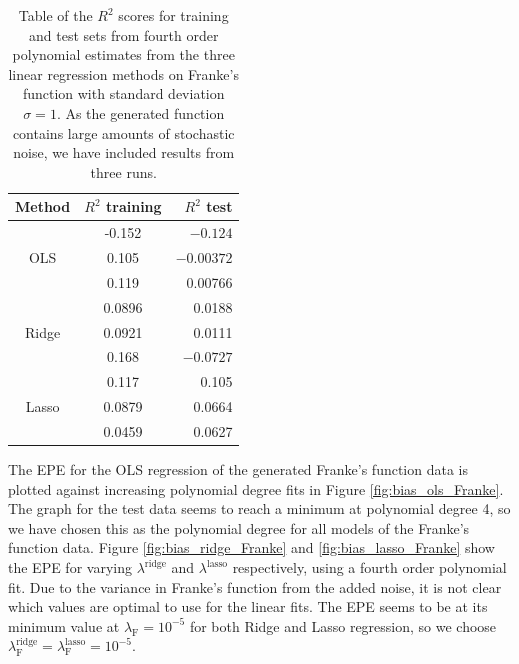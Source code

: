 \documentclass[a4paper, 10pt]{article}
\begin{document}
\begin{multicols}{2}
\begin{table}[H]
\caption{Table of the $R^2$ scores for training and test sets from fourth order polynomial estimates from  the three linear regression methods on Franke's function with standard deviation $\sigma=1$. As the generated function contains large amounts of stochastic noise, we have included results from three runs.\vspace{2pt}}

\label{tab:R2_stddev=1}
\centering
\begin{tabular}{|c|c|r|} \hline
Method & $R^2$ training & $R^2$ test \\ \hline
\multirow{3}{*}{OLS} & -0.152& $-0.124$\\
											& 0.105 & $-0.00372$ \\
											& 0.119   & 0.00766\\ \cline{1-3}
\multirow{3}{*}{Ridge} & 0.0896 & 0.0188\\
											& 0.0921   & 0.0111 \\
											& 0.168      & $-0.0727$\\ \cline{1-3}
\multirow{3}{*}{Lasso} & 0.117& 0.105\\
											& 0.0879   & 0.0664 \\
											& 0.0459 & 0.0627\\ \cline{1-3}
\end{tabular}
\end{table}

The EPE for the OLS regression of the generated Franke's function data is plotted against increasing polynomial degree fits in Figure \ref{fig:bias_ols_Franke}.  The graph for the test data seems to reach a minimum at polynomial degree 4, so we have chosen this as the polynomial degree for all models of the Franke's function data. Figure \ref{fig:bias_ridge_Franke} and \ref{fig:bias_lasso_Franke} show the EPE for varying $\lambda^\text{ridge}$ and $\lambda^\text{lasso}$ respectively, using a fourth order polynomial fit. Due to the variance in Franke's function from the added  noise, it is not clear which values are optimal to use for the linear fits. The EPE seems to be at its minimum value at $\lambda_\text{F}=10^{-5}$ for both Ridge and Lasso regression, so we choose $\lambda^\text{ridge}_\text{F} = \lambda^\text{lasso}_\text{F}=10^{-5}$.

\end{multicols}
\end{document}
